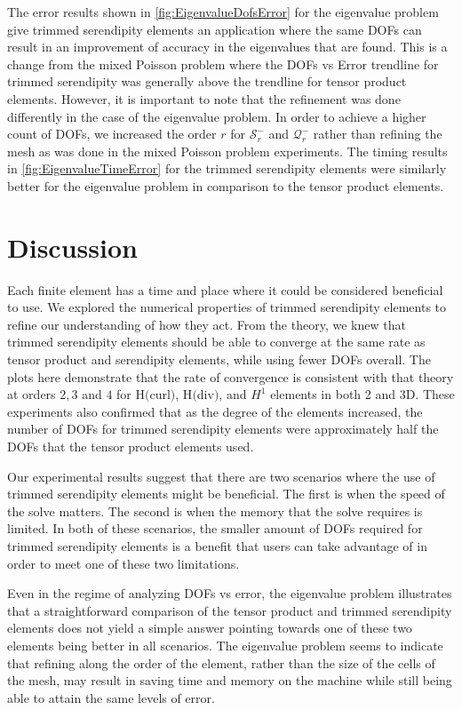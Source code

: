 \documentclass[format=acmsmall,screen,timestamp=false,a4paper]{acmart}
\begin{document}
The error results shown in \cref{fig:EigenvalueDofsError} for the eigenvalue problem give trimmed serendipity elements an application where the same DOFs can result in an improvement of accuracy in the eigenvalues that are found.  This is a change from the mixed Poisson problem where the DOFs vs Error trendline for trimmed serendipity was generally above the trendline for tensor product elements.  However, it is important to note that the refinement was done differently in the case of the eigenvalue problem.  In order to achieve a higher count of DOFs, we increased the order $r$ for $\mathcal{S}^-_r$ and $\mathcal{Q}^-_r$ rather than refining the mesh as was done in the mixed Poisson problem experiments.  The timing results in \cref{fig:EigenvalueTimeError} for the trimmed serendipity elements were similarly better for the eigenvalue problem in comparison to the tensor product elements.


\section{Discussion}

Each finite element has a time and place where it could be considered beneficial to use.  We explored the numerical properties of trimmed serendipity elements to refine our understanding of how they act.  From the theory, we knew that trimmed serendipity elements should be able to converge at the same rate as tensor product and serendipity elements, while using fewer DOFs overall.  The plots here demonstrate that the rate of convergence is consistent with that theory at orders $2, 3$ and $4$ for H$($curl$)$, H$($div$)$, and $H^1$ elements in both 2 and 3D.  These experiments also confirmed that as the degree of the elements increased, the number of DOFs for trimmed serendipity elements were approximately half the DOFs that the tensor product elements used.

Our experimental results suggest that there are two scenarios where the use of trimmed serendipity elements might be beneficial.  The first is when the speed of the solve matters.  The second is when the memory that the solve requires is limited.  In both of these scenarios, the smaller amount of DOFs required for trimmed serendipity elements is a benefit that users can take advantage of in order to meet one of these two limitations.  

Even in the regime of analyzing DOFs vs error, the eigenvalue problem illustrates that a straightforward comparison of the tensor product and trimmed serendipity elements does not yield a simple answer pointing towards one of these two elements being better in all scenarios.  The eigenvalue problem seems to indicate that refining along the order of the element, rather than the size of the cells of the mesh, may result in saving time and memory on the machine while still being able to attain the same levels of error.
\end{document}
